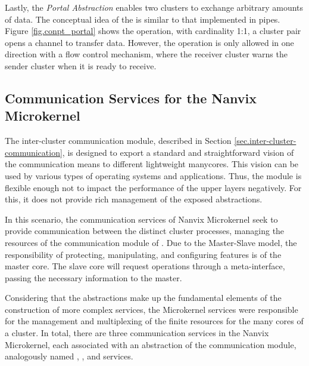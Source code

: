 				Lastly, the \textit{Portal Abstraction} enables two clusters to exchange arbitrary
				amounts of data.
				The conceptual idea of the \portal is similar to that implemented in \posix pipes.
				Figure \ref{fig.conpt_portal} shows the \portal operation, with cardinality
				1:1, a cluster pair opens a channel to transfer data.
				However, the operation is only allowed in one direction with a flow control mechanism,
				where the receiver cluster warns the sender cluster when it is ready to receive.
		
	\subsection{Communication Services for the Nanvix Microkernel}
	
		The inter-cluster communication module, described in Section \ref{sec.inter-cluster-communication},
		is designed to export a standard and straightforward vision of
		the communication means to different lightweight manycores.
		This vision can be used by various types of operating systems
		and applications.
		Thus, the module is flexible enough not to impact the performance
		of the upper layers negatively.
		For this, it does not provide rich management of the exposed abstractions.

		In this scenario, the communication services of Nanvix Microkernel seek
		to provide communication between the distinct cluster processes, managing
		the resources of the communication module of \hal.
		Due to the Master-Slave model, the responsibility of protecting,
		manipulating, and configuring \hal features is of the master core.
		The slave core will request operations through a meta-interface,
		passing the necessary information to the master.

		Considering that the abstractions make up the fundamental elements of
		the construction of more complex services, the Microkernel services
		were responsible for the management and multiplexing of the finite
		resources for the many cores of a cluster.
		In total, there are three communication services in the Nanvix Microkernel,
		each associated with an abstraction of the communication module,
		analogously named \sync, \mailbox, and \portal services.

